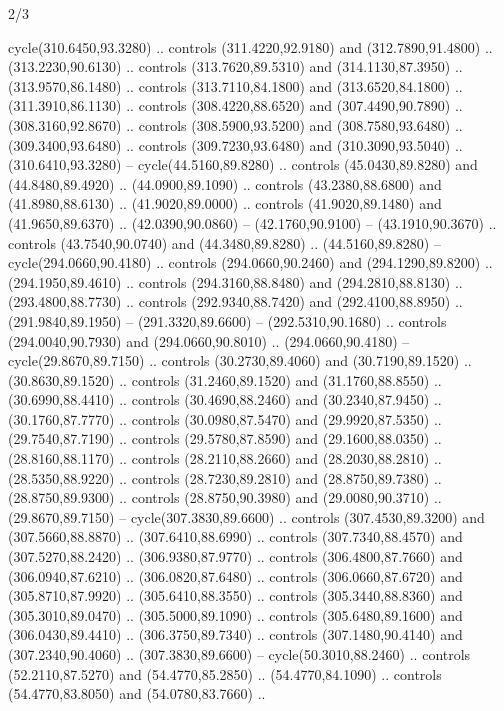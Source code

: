 \begin{flagdescription}{2/3}
\begin{scope}[xshift=0.5\flaglength,yshift=0.5\flagwidth,scale=\stretchfactor]
\begin{scope}[scale=0.001645\flagwidth,yshift=65mm,xshift=-63mm]
\begin{scope}[y=0.80pt, x=0.80pt, yscale=-1,]
\begin{scope}[cm={{1.33333,0.0,0.0,1.33333,(0.0,1e-05)}}]
  cycle(310.6450,93.3280) .. controls (311.4220,92.9180) and (312.7890,91.4800)
  .. (313.2230,90.6130) .. controls (313.7620,89.5310) and (314.1130,87.3950) ..
  (313.9570,86.1480) .. controls (313.7110,84.1800) and (313.6520,84.1800) ..
  (311.3910,86.1130) .. controls (308.4220,88.6520) and (307.4490,90.7890) ..
  (308.3160,92.8670) .. controls (308.5900,93.5200) and (308.7580,93.6480) ..
  (309.3400,93.6480) .. controls (309.7230,93.6480) and (310.3090,93.5040) ..
  (310.6410,93.3280) -- cycle(44.5160,89.8280) .. controls (45.0430,89.8280) and
  (44.8480,89.4920) .. (44.0900,89.1090) .. controls (43.2380,88.6800) and
  (41.8980,88.6130) .. (41.9020,89.0000) .. controls (41.9020,89.1480) and
  (41.9650,89.6370) .. (42.0390,90.0860) -- (42.1760,90.9100) --
  (43.1910,90.3670) .. controls (43.7540,90.0740) and (44.3480,89.8280) ..
  (44.5160,89.8280) -- cycle(294.0660,90.4180) .. controls (294.0660,90.2460)
  and (294.1290,89.8200) .. (294.1950,89.4610) .. controls (294.3160,88.8480)
  and (294.2810,88.8130) .. (293.4800,88.7730) .. controls (292.9340,88.7420)
  and (292.4100,88.8950) .. (291.9840,89.1950) -- (291.3320,89.6600) --
  (292.5310,90.1680) .. controls (294.0040,90.7930) and (294.0660,90.8010) ..
  (294.0660,90.4180) -- cycle(29.8670,89.7150) .. controls (30.2730,89.4060) and
  (30.7190,89.1520) .. (30.8630,89.1520) .. controls (31.2460,89.1520) and
  (31.1760,88.8550) .. (30.6990,88.4410) .. controls (30.4690,88.2460) and
  (30.2340,87.9450) .. (30.1760,87.7770) .. controls (30.0980,87.5470) and
  (29.9920,87.5350) .. (29.7540,87.7190) .. controls (29.5780,87.8590) and
  (29.1600,88.0350) .. (28.8160,88.1170) .. controls (28.2110,88.2660) and
  (28.2030,88.2810) .. (28.5350,88.9220) .. controls (28.7230,89.2810) and
  (28.8750,89.7380) .. (28.8750,89.9300) .. controls (28.8750,90.3980) and
  (29.0080,90.3710) .. (29.8670,89.7150) -- cycle(307.3830,89.6600) .. controls
  (307.4530,89.3200) and (307.5660,88.8870) .. (307.6410,88.6990) .. controls
  (307.7340,88.4570) and (307.5270,88.2420) .. (306.9380,87.9770) .. controls
  (306.4800,87.7660) and (306.0940,87.6210) .. (306.0820,87.6480) .. controls
  (306.0660,87.6720) and (305.8710,87.9920) .. (305.6410,88.3550) .. controls
  (305.3440,88.8360) and (305.3010,89.0470) .. (305.5000,89.1090) .. controls
  (305.6480,89.1600) and (306.0430,89.4410) .. (306.3750,89.7340) .. controls
  (307.1480,90.4140) and (307.2340,90.4060) .. (307.3830,89.6600) --
  cycle(50.3010,88.2460) .. controls (52.2110,87.5270) and (54.4770,85.2850) ..
  (54.4770,84.1090) .. controls (54.4770,83.8050) and (54.0780,83.7660) ..

\end{scope}
\end{scope}
\end{scope}
\end{scope}
\end{flagdescription}

